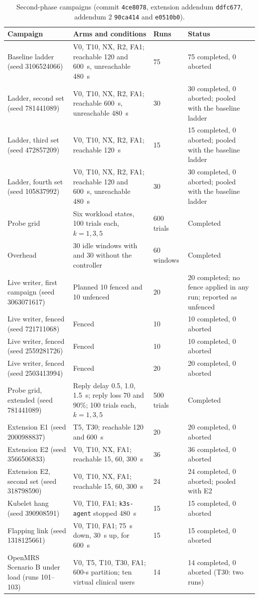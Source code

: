 \documentclass[10pt]{article}
\begin{document}
\begin{table}[ht]
\centering
\caption{Second-phase campaigns (commit \texttt{4ce8078}, extension addendum \texttt{ddfc677}, addendum 2 \texttt{90ca414} and \texttt{e0510b0}).}\label{tab:s14}
\footnotesize
\begin{tabular}{@{}p{}p{}p{}p{}@{}}
\toprule
Campaign & Arms and conditions & Runs & Status \\
\midrule
Baseline ladder (seed 3106524066) & V0, T10, NX, R2, FA1; reachable 120 and 600~s, unreachable 480~s & 75 & 75 completed, 0 aborted \\
Ladder, second set (seed 781441089) & V0, T10, NX, R2, FA1; reachable 600~s, unreachable 480~s & 30 & 30 completed, 0 aborted; pooled with the baseline ladder \\
Ladder, third set (seed 472857209) & V0, T10, NX, R2, FA1; reachable 120~s & 15 & 15 completed, 0 aborted; pooled with the baseline ladder \\
Ladder, fourth set (seed 105837992) & V0, T10, NX, R2, FA1; reachable 120 and 600~s, unreachable 480~s & 30 & 30 completed, 0 aborted; pooled with the baseline ladder \\
Probe grid & Six workload states, 100 trials each, $k=1,3,5$ & 600 trials & Completed \\
Overhead & 30 idle windows with and 30 without the controller & 60 windows & Completed \\
Live writer, first campaign (seed 3063071617) & Planned 10 fenced and 10 unfenced & 20 & 20 completed; no fence applied in any run; reported as unfenced \\
Live writer, fenced (seed 721711068) & Fenced & 10 & 10 completed, 0 aborted \\
Live writer, fenced (seed 2559281726) & Fenced & 10 & 10 completed, 0 aborted \\
Live writer, fenced (seed 2503413994) & Fenced & 20 & 20 completed, 0 aborted \\
Probe grid, extended (seed 781441089) & Reply delay 0.5, 1.0, 1.5~s; reply loss 70 and 90\%; 100 trials each, $k=1,3,5$ & 500 trials & Completed \\
Extension E1 (seed 2000988837) & T5, T30; reachable 120 and 600~s & 20 & 20 completed, 0 aborted \\
Extension E2 (seed 3566506833) & V0, T10, NX, FA1; reachable 15, 60, 300~s & 36 & 36 completed, 0 aborted \\
Extension E2, second set (seed 318798590) & V0, T10, NX, FA1; reachable 15, 60, 300~s & 24 & 24 completed, 0 aborted; pooled with E2 \\
Kubelet hang (seed 390908591) & V0, T10, FA1; \texttt{k3s-agent} stopped 480~s & 15 & 15 completed, 0 aborted \\
Flapping link (seed 1318125661) & V0, T10, FA1; 75~s down, 30~s up, for 600~s & 15 & 15 completed, 0 aborted \\
OpenMRS Scenario B under load (runs 101--103) & V0, T5, T10, T30, FA1; 600-s partition; ten virtual clinical users & 14 & 14 completed, 0 aborted (T30: two runs) \\
\bottomrule
\end{tabular}
\end{table}
\end{document}
